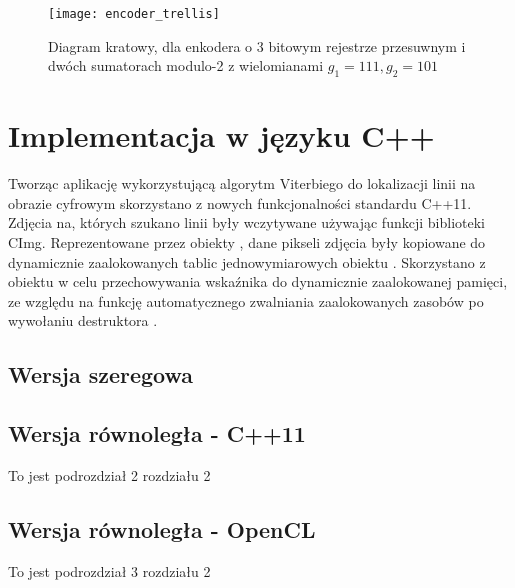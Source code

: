 \documentclass[document.tex]{subfiles}
\begin{document}
\begin{figure}[h]
\texttt{[image: encoder\_trellis]}
\caption{Diagram kratowy, dla enkodera o 3 bitowym rejestrze przesuwnym 
i dwóch sumatorach modulo-2 z wielomianami $g_1 = 111, g_2 = 101$ \protect\cite{Comm_Sklar}}
\label{fig:encoder_trellis}
\end{figure}





\clearpage
\section{Implementacja w języku C++}
\indent Tworząc aplikację wykorzystującą algorytm Viterbiego do lokalizacji linii
na obrazie cyfrowym skorzystano z nowych funkcjonalności standardu C++11. 
Zdjęcia na, których szukano linii były wczytywane używając funkcji biblioteki
CImg. Reprezentowane przez obiekty , dane pikseli zdjęcia były kopiowane do
dynamicznie zaalokowanych tablic jednowymiarowych obiektu . Skorzystano z obiektu  w celu przechowywania wskaźnika do dynamicznie zaalokowanej pamięci, ze względu na funkcję automatycznego zwalniania zaalokowanych zasobów po wywołaniu destruktora .  

\subsection{Wersja szeregowa}

 

 


\subsection{Wersja równoległa - C++11}
To jest podrozdział 2 rozdziału 2
\subsection{Wersja równoległa - OpenCL}
To jest podrozdział 3 rozdziału 2
\end{document}
